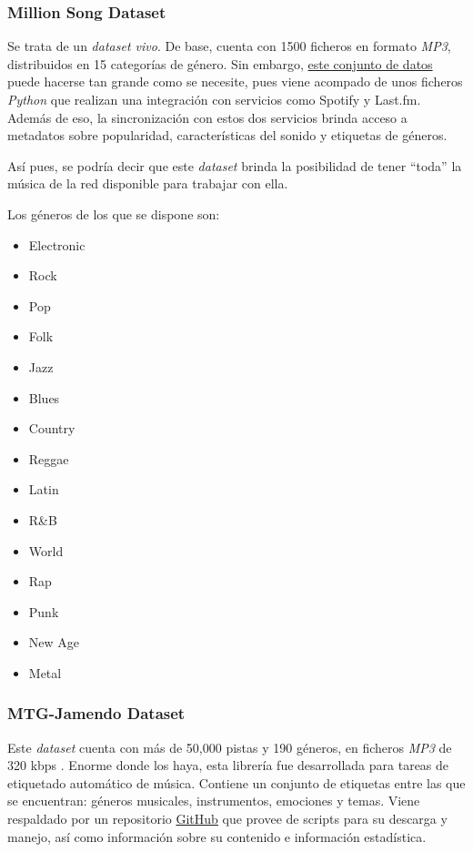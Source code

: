 \subsubsection{Million Song Dataset}

Se trata de un \emph{dataset vivo}. De base, cuenta con 1500 ficheros en formato \emph{MP3}, distribuidos en 15 categorías de género. Sin embargo, \href{https://www.kaggle.com/datasets/undefinenull/million-song-dataset-spotify-lastfm}{este conjunto de datos} puede hacerse tan grande como se necesite, pues viene acompado de unos ficheros \emph{Python} que realizan una integración con servicios como Spotify y Last.fm. Además de eso, la sincronización con estos dos servicios brinda acceso a metadatos sobre popularidad, características del sonido y etiquetas de géneros.

Así pues, se podría decir que este \emph{dataset} brinda la posibilidad de tener ``toda'' la música de la red disponible para trabajar con ella.

Los géneros de los que se dispone son:
\begin{multicols}{4}
\begin{itemize}
    \item Electronic
    \item Rock
    \item Pop
    \item Folk
    \item Jazz
    \item Blues
    \item Country
    \item Reggae
    \item Latin
    \item R\&B
    \item World
    \item Rap
    \item Punk
    \item New Age
    \item Metal
\end{itemize}
\end{multicols}

\subsubsection{MTG-Jamendo Dataset}

Este \emph{dataset} cuenta con más de 50,000 pistas y 190 géneros, en ficheros \emph{MP3} de 320 kbps . Enorme donde los haya, esta librería fue desarrollada para tareas de etiquetado automático de música. Contiene un conjunto de etiquetas entre las que se encuentran: géneros musicales, instrumentos, emociones y temas. Viene respaldado por un repositorio \href{https://github.com/MTG/mtg-jamendo-dataset}{GitHub} que provee de scripts para su descarga y manejo, así como información sobre su contenido e información estadística.

